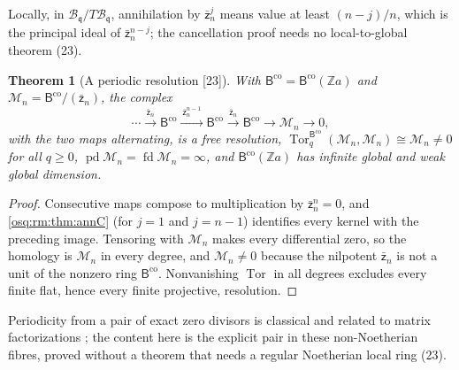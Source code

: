 \documentclass[11pt,letterpaper]{article}
\numberwithin{equation}{section}
\newtheorem{theorem}{Theorem}[section]
\theoremstyle{definition}
\theoremstyle{remark}
\theoremstyle{plain}
\newcommand{\Z}{\mathbb Z}
\newcommand{\Tor}{\operatorname{Tor}}
\newcommand{\pd}{\operatorname{pd}}
\newcommand{\fd}{\operatorname{fd}}
\newcommand{\src}[1]{\textup{\textsf{[#1]}}}
\begin{document}
Locally, in $\mathscr B_{\mathfrak q}/T\mathscr B_{\mathfrak q}$, annihilation by $\bar{\mathsf z}_n^j$ means value at least $(n-j)/n$, which is the principal ideal of
$\bar{\mathsf z}_n^{n-j}$; the cancellation proof needs no local-to-global theorem (23).

\begin{theorem}[A periodic resolution \src{23}]\label{osq:rm:thm:periodic}
With $\mathsf B^{\mathrm{co}}=\mathsf B^{\mathrm{co}}(\Z a)$ and $\mathscr M_n=\mathsf B^{\mathrm{co}}/(\bar{\mathsf z}_n)$, the complex
\begin{equation}\label{osq:rm:eq:periodic}
 \cdots\xrightarrow{\ \bar{\mathsf z}_n\ }\mathsf B^{\mathrm{co}}\xrightarrow{\ \bar{\mathsf z}_n^{n-1}\ }\mathsf B^{\mathrm{co}}\xrightarrow{\ \bar{\mathsf z}_n\ }\mathsf B^{\mathrm{co}}
 \longrightarrow\mathscr M_n\longrightarrow0,
\end{equation}
with the two maps alternating, is a free resolution, $\Tor_q^{\mathsf B^{\mathrm{co}}}(\mathscr M_n,\mathscr M_n)\cong\mathscr M_n\ne0$ for all $q\ge0$,
$\pd\mathscr M_n=\fd\mathscr M_n=\infty$, and $\mathsf B^{\mathrm{co}}(\Z a)$ has infinite global and weak global dimension.
\end{theorem}
\begin{proof}
Consecutive maps compose to multiplication by $\bar{\mathsf z}_n^n=0$, and \cref{osq:rm:thm:annC} (for $j=1$ and $j=n-1$) identifies every kernel with the preceding
image. Tensoring with $\mathscr M_n$ makes every differential zero, so the homology is $\mathscr M_n$ in every degree, and $\mathscr M_n\ne0$ because the
nilpotent $\bar{\mathsf z}_n$ is not a unit of the nonzero ring $\mathsf B^{\mathrm{co}}$. Nonvanishing $\Tor$ in all degrees excludes every finite flat, hence every
finite projective, resolution.
\end{proof}

Periodicity from a pair of exact zero divisors is classical and related to matrix factorizations \cite{Eisenbud}; the content here is the explicit
pair in these non-Noetherian fibres, proved without a theorem that needs a regular Noetherian local ring (23).
\end{document}
